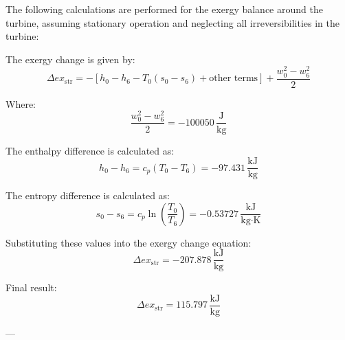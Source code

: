 The following calculations are performed for the exergy balance around the turbine, assuming stationary operation and neglecting all irreversibilities in the turbine:  

The exergy change is given by:  
\[
\Delta ex_{\text{str}} = -\left[ h_0 - h_6 - T_0 \left( s_0 - s_6 \right) + \text{other terms} \right] + \frac{w_0^2 - w_6^2}{2}
\]  

Where:  
\[
\frac{w_0^2 - w_6^2}{2} = -100050 \, \frac{\text{J}}{\text{kg}}
\]  

The enthalpy difference is calculated as:  
\[
h_0 - h_6 = c_p \left( T_0 - T_6 \right) = -97.431 \, \frac{\text{kJ}}{\text{kg}}
\]  

The entropy difference is calculated as:  
\[
s_0 - s_6 = c_p \ln \left( \frac{T_0}{T_6} \right) = -0.53727 \, \frac{\text{kJ}}{\text{kg·K}}
\]  

Substituting these values into the exergy change equation:  
\[
\Delta ex_{\text{str}} = -207.878 \, \frac{\text{kJ}}{\text{kg}}
\]  

Final result:  
\[
\Delta ex_{\text{str}} = 115.797 \, \frac{\text{kJ}}{\text{kg}}
\]  

---